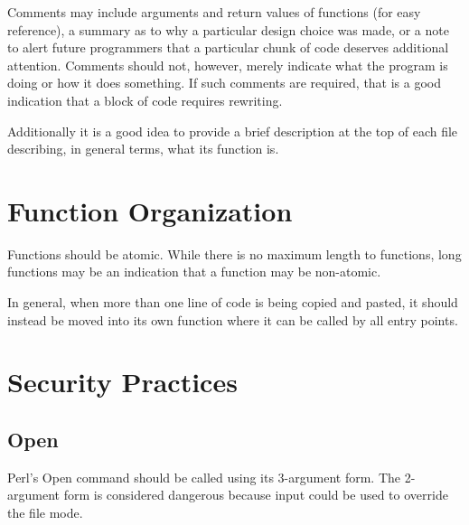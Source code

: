 \documentclass{article}
\begin{document}
Comments may include arguments and return values of functions (for
easy reference), a summary as to why a particular design choice was
made, or a note to alert future programmers that a particular chunk of
code deserves additional attention.  Comments should not, however,
merely indicate what the program is doing or how it does something.
If such comments are required, that is a good indication that a block
of code requires rewriting.

Additionally it is a good idea to provide a brief description at the top of each
file describing, in general terms, what its function is.

\section{Function Organization}

Functions should be atomic.  While there is no maximum length to functions, long
functions may be an indication that a function may be non-atomic.

In general, when more than one line of code is being copied and
pasted, it should instead be moved into its own function where it can
be called by all entry points.

\section{Security Practices}
\subsection{Open}
Perl's Open command should be called using its 3-argument form.  The 2-argument 
form is considered dangerous because input could be used to override the file 
mode.
\end{document}

